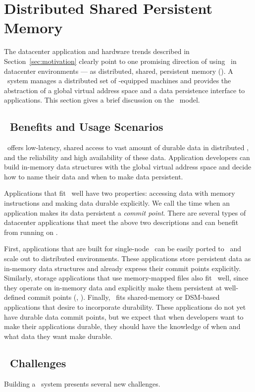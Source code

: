 \section{Distributed Shared Persistent Memory}
\label{sec:dspm}

The datacenter application and hardware trends described in Section~\ref{sec:motivation} 
clearly point to one promising direction of using \nvm\ in datacenter environments --- 
as distributed, shared, persistent memory (\dsnvm).
A \dsnvm\ system manages a distributed set of \nvm{}-equipped machines  
and provides the abstraction of a global virtual address space and a data persistence interface to applications.
This section gives a brief discussion on the \dsnvm\ model.

\subsection{\dsnvm\ Benefits and Usage Scenarios}
\dsnvm\ offers low-latency, shared access to vast amount of durable data in distributed \nvm,
and the reliability and high availability of these data.
Application developers can build in-memory data structures with the global virtual address space 
and decide how to name their data and when to make data persistent.

Applications that fit \dsnvm\ well have two properties:
accessing data with memory instructions and making data durable explicitly.
We call the time when an application makes its data persistent a {\em commit point}.
There are several types of datacenter applications that meet the above two descriptions and can benefit from running on \dsnvm.

First, applications that are built for single-node \nvm\
can be easily ported to \dsnvm\ and scale out to distributed environments.
These applications store persistent data as in-memory data structures 
and already express their commit points explicitly.
Similarly, storage applications that use memory-mapped files also fit \dsnvm\ well,
since they operate on in-memory data and explicitly make them persistent at well-defined commit points (\ie, \msync).
Finally, \dsnvm\ fits shared-memory or DSM-based applications that desire to incorporate durability.
These applications do not yet have durable data commit points,
but we expect that when developers want to make their applications durable, 
they should have the knowledge of when and what data they want make durable.

\subsection{\dsnvm\ Challenges}
\label{sec:challenges}
Building a \dsnvm\ system presents several new challenges.

